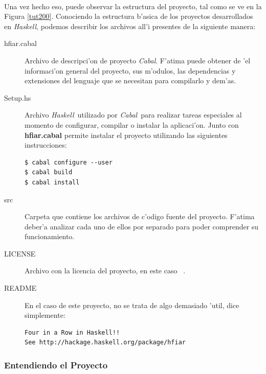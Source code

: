 \documentclass[a4paper]{article}
\newcommand{\haskell}{\textsl{Haskell}}
\newcommand{\cabal}{\textsl{Cabal}}
\begin{document}
\paragraph{}Una vez hecho eso, puede observar la estructura del proyecto, tal como se ve en la Figura \ref{tut200}.  Conociendo la estructura b'asica de los proyectos desarrollados en \haskell, podemos describir los archivos all'i presentes de la siguiente manera:
\begin{description}
\item[hfiar.cabal] Archivo de descripci'on de proyecto \cabal.  F'atima puede obtener de 'el informaci'on general del proyecto, sus m'odulos, las dependencias y extensiones del lenguaje que se necesitan para compilarlo y dem'as.  
\item[Setup.hs] Archivo \haskell\ utilizado por \cabal\ para realizar tareas especiales al momento de configurar, compilar o instalar la aplicaci'on.  Junto con \textbf{hfiar.cabal} permite instalar el proyecto utilizando las siguientes instrucciones:
		\begin{center}\begin{lstlisting}
$ cabal configure --user
$ cabal build
$ cabal install
		\end{lstlisting}\end{center}
\item[src] Carpeta que contiene los archivos de c'odigo fuente del proyecto.  F'atima deber'a analizar cada uno de ellos por separado para poder comprender su funcionamiento.
\item[LICENSE] Archivo con la licencia del proyecto, en este caso ~\cite{bsd}.
\item[README] En el caso de este proyecto, no se trata de algo demasiado 'util, dice simplemente:
\begin{verbatim}
Four in a Row in Haskell!!
See http://hackage.haskell.org/package/hfiar
\end{verbatim}
\end{description}

\newpage
\subsubsection{Entendiendo el Proyecto}
\end{document}
